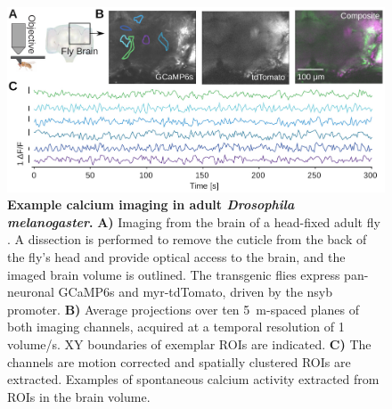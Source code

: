 \documentclass[10pt,letterpaper]{article}
\begin{document}
%
%
\begin{figure}[t]
\begin{center}
    \includegraphics[width=\textwidth]{fig8.jpg}
\end{center}
    \caption{{\bf Example calcium imaging in adult \textit{Drosophila melanogaster}.} \textbf{A)} Imaging from the brain of a head-fixed adult fly \cite{Pacheco2021}. A dissection is performed to remove the cuticle from the back of the fly's head and provide optical access to the brain, and the imaged brain volume is outlined. The transgenic flies express pan-neuronal GCaMP6s and myr-tdTomato, driven by the nsyb promoter. \textbf{B)} Average projections over ten 5~\textmu m-spaced planes of both imaging channels, acquired at a temporal resolution of 1 volume/s. XY boundaries of exemplar ROIs are indicated. \textbf{C)} The channels are motion corrected and spatially clustered ROIs are extracted. Examples of spontaneous calcium activity extracted from ROIs in the brain volume.}
    \label{fig8}
\end{figure}
\end{document}
